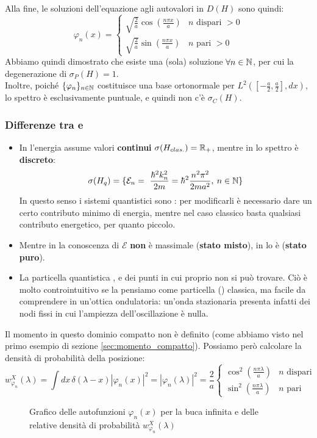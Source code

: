 \documentclass[../../FisicaTeorica.tex]{subfiles}
\begin{document}
Alla fine, le soluzioni dell'equazione agli autovalori in $D(H)$ sono quindi:
\[
\varphi_n(x) = \begin{cases}
\sqrt{\frac{2}{a}}\cos\left(\frac{n\pi x}{a}\right) & n \text{ dispari } >0\\
\sqrt{\frac{2}{a}}\sin\left(\frac{n\pi x}{a}\right) &
n \text{ pari } > 0
\end{cases}
\]
Abbiamo quindi dimostrato che esiste una (sola) soluzione $\forall n \in \mathbb{N}$, per cui la degenerazione di $\sigma_P(H)=1$.\\
Inoltre, poiché $\{\varphi_n\}_{n\in\mathbb{N}}$ costituisce una base ortonormale per $L^2([-\frac{a}{2},\frac{a}{2}],dx)$, lo spettro è esclusivamente puntuale, e quindi non c'è $\sigma_C(H)$.\\
\subsubsection{Differenze tra \MC e \MQ}
\begin{itemize}
\item In \MC l'energia assume valori \textbf{continui} $\sigma(H_{clas.})=\mathbb{R}_+$, mentre in \MQ lo spettro è \textbf{discreto}:
\[
\sigma(H_q)=\{\mathcal{E}_n =\ \frac{\hbar^2 k_n^2}{2m} = \hbar^2 \frac{n^2 \pi^2}{2m a^2}, \> n\in \mathbb{N}\}
\]
In questo senso i sistemi quantistici sono : per modificarli è necessario dare un certo contributo minimo di energia, mentre nel caso classico basta qualsiasi contributo energetico, per quanto piccolo.
\item Mentre in \MC la conoscenza di $\mathcal{E}$ \textbf{non} è massimale (\textbf{stato misto}), in \MQ lo è (\textbf{stato puro}).
\item La particella quantistica , e dei punti in cui proprio non si può trovare. Ciò è molto controintuitivo se la pensiamo come particella () classica, ma facile da comprendere in un'ottica ondulatoria: un'onda stazionaria presenta infatti dei nodi fissi in cui l'ampiezza dell'oscillazione è nulla.
\end{itemize}
Il momento in questo dominio compatto non è definito (come abbiamo visto nel primo esempio di sezione \ref{sec:momento_compatto}). Possiamo però calcolare la densità di probabilità della posizione:
\[
w_{\varphi_n}^X(\lambda) = \int dx\, \delta(\lambda-x) |\varphi_n(x)|^2 = |\varphi_n(\lambda)|^2 = \frac{2}{a}\begin{cases}
\cos^2 \left(\frac{n\pi \lambda}{a}\right) & n \text{ dispari }\\
\sin^2\left(\frac{n\pi \lambda}{a}\right) & n \text{ pari}
\end{cases}
\]
\begin{figure}[H]
    \centering
    
    \caption{Grafico delle autofunzioni $\varphi_n(x)$ per la buca infinita e delle relative densità di probabilità $w_{\varphi_n}^X(\lambda)$}
    \label{fig:plot_bucainfinita}
\end{figure}
\end{document}
